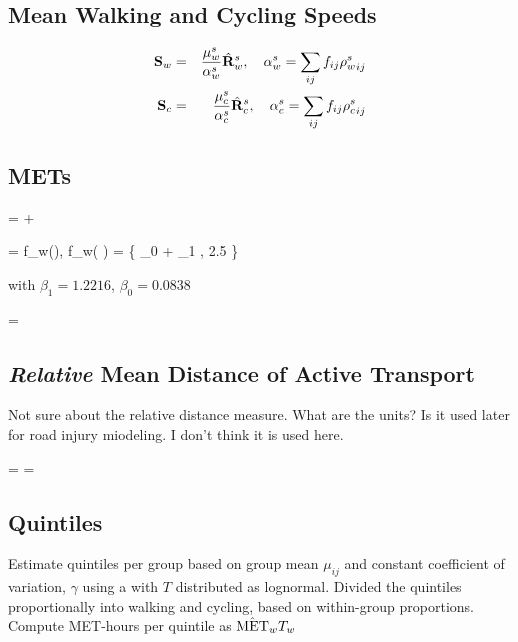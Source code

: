 \subsection{Mean Walking and Cycling Speeds}

\begin{eqnarray}
\mathbf{S}_w &=& \frac{\mu^s_w}{\alpha^s_w}\hat{\mathbf{R}}^s_w, \quad \alpha^s_w = \sum_{ij} f_{ij}{\rho^s_w}_{ij}\\
\mathbf{S}_c &=& \frac{\mu^s_c}{\alpha^s_c}\hat{\mathbf{R}}^s_c, \quad \alpha^s_c = \sum_{ij} f_{ij}{\rho^s_c}_{ij}
\end{eqnarray}


\subsection{METs}
\beq
\metTransport = \metWalk + \metCycle
\eeq

\beq
\metWalk = f_w\left(\speedWalk\right), \quad f_w\left( \sijw \right) = \max\{ \beta_0 + \beta_1 \sijw, 2.5 \}
\eeq

with $\beta_1 = 1.2216$, $\beta_0 = 0.0838$ 

\beq
\metCycle = 
\eeq

\subsection{\textit{Relative} Mean Distance of Active Transport}

Not sure about the relative distance measure.  What are the units?  Is
it used later for road injury miodeling.  I don't think it is used
here.

\beq
\distWalkMean =  \speedWalk \cdot \walkMean
\eeq
\beq
\distCycleMean =  \speedCycle \cdot \cycleMean
\eeq

\subsection{Quintiles}

Estimate quintiles per group based on group mean $\mu_{ij}$ and
constant coefficient of variation, $\gamma$ using a with $T$
distributed as lognormal.  Divided the quintiles proportionally into
walking and cycling, based on within-group proportions.  Compute MET-hours per quintile as $\hat{\mathbf{\mathrm{MET}}}_{w} T_w$

